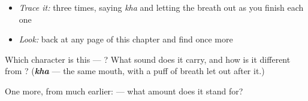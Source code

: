 \begin{itemize}
\raggedright
  \item \emph{Trace it:}  three times, saying \emph{kha} and letting the breath out as you finish each one
  \item \emph{Look:} back at any page of this chapter and find  once more
\end{itemize}

\begin{tcolorbox}[breakable,colback=teal!4,colframe=teal!35!black,title={Before you move on}]
Which character is this — ? What sound does it carry, and how is it different from ? (\emph{\textbf{kha}} — the same mouth, with a puff of breath let out after it.)

One more, from much earlier:  — what amount does it stand for?
\end{tcolorbox}
